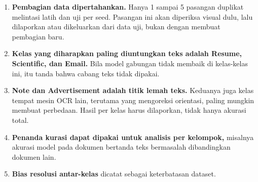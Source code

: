 \begin{enumerate}
  \item \textbf{Pembagian data dipertahankan.} Hanya 1 sampai 5 pasangan duplikat
  melintasi latih dan uji per seed. Pasangan ini akan diperiksa visual dulu, lalu
  dilaporkan atau dikeluarkan dari data uji, bukan dengan membuat pembagian baru.
  \item \textbf{Kelas yang diharapkan paling diuntungkan teks adalah Resume, Scientific,
  dan Email.} Bila model gabungan tidak membaik di kelas-kelas ini, itu tanda bahwa cabang
  teks tidak dipakai.
  \item \textbf{Note dan Advertisement adalah titik lemah teks.} Keduanya juga kelas
  tempat mesin OCR lain, terutama yang mengoreksi orientasi, paling mungkin membuat
  perbedaan. Hasil per kelas harus dilaporkan, tidak hanya akurasi total.
  \item \textbf{Penanda kurasi dapat dipakai untuk analisis per kelompok,} misalnya
  akurasi model pada dokumen bertanda teks bermasalah dibandingkan dokumen lain.
  \item \textbf{Bias resolusi antar-kelas} dicatat sebagai keterbatasan dataset.
\end{enumerate}
